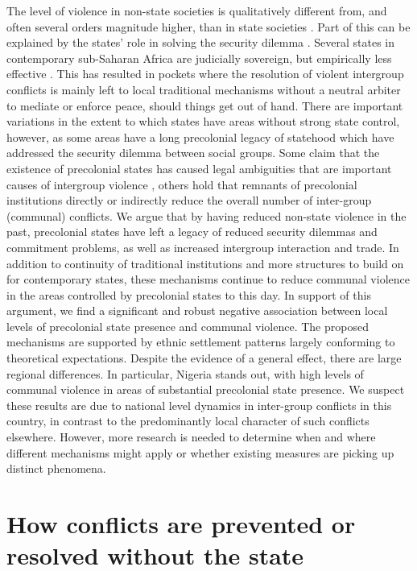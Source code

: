 The level of violence in non-state societies is qualitatively different from,
and often several orders magnitude higher, than in state societies
\citep{diamond2013world, LeBlanc2003, Pinker2012}. Part of this can be explained
by the states’ role in solving the security dilemma \citep{Hobbes, Lake_1996}.
Several states in contemporary sub-Saharan Africa are judicially sovereign, but
empirically less effective \citep{Jackson_1982}. This has resulted in pockets
where the resolution of violent intergroup conflicts is mainly left to local
traditional mechanisms without a neutral arbiter to mediate or enforce peace,
should things get out of hand. There are important variations in the extent to
which states have areas without strong state control, however, as some areas
have a long precolonial legacy of statehood which have addressed the security
dilemma between social groups. Some claim that the existence of precolonial
states has caused legal ambiguities that are important causes of intergroup
violence \citep{Eck2014}, others hold that remnants of precolonial institutions
directly \citep{Herbst2014, Wig2018} or indirectly reduce the overall number of
inter-group (communal) conflicts. We argue that by having reduced non-state
violence in the past, precolonial states have left a legacy of reduced security
dilemmas and commitment problems, as well as increased intergroup interaction
and trade. In addition to continuity of traditional institutions and more
structures to build on for contemporary states, these mechanisms continue to
reduce communal violence in the areas controlled by precolonial states to this
day. In support of this argument, we find a significant and robust negative
association between local levels of precolonial state presence and communal
violence. The proposed mechanisms are supported by ethnic settlement patterns
largely conforming to theoretical expectations. Despite the evidence of a
general effect, there are large regional differences. In particular, Nigeria
stands out, with high levels of communal violence in areas of substantial
precolonial state presence. We suspect these results are due to national level
dynamics in inter-group conflicts in this country, in contrast to the
predominantly local character of such conflicts elsewhere. However, more
research is needed to determine when and where different mechanisms might apply
or whether existing measures are picking up distinct phenomena.

\section{How conflicts are prevented or resolved without the state}
\label{How conflicts are prevented or resolved without the state}


